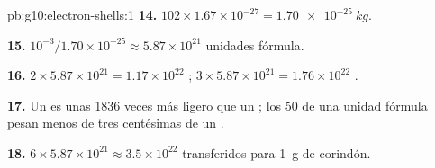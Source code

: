 \begin{solution}{pb:g10:electron-shells:1}
\textbf{14.} $102 \times 1.67 \times 10^{-27} = \qty{1.70e-25}{kg}$.

\textbf{15.} $10^{-3} / 1.70 \times 10^{-25} \approx 5.87 \times 10^{21}$
unidades fórmula.

\textbf{16.} $2 \times 5.87 \times 10^{21} = 1.17 \times 10^{22}$
 ; $3 \times 5.87 \times 10^{21} = 1.76 \times 10^{22}$
 .

\textbf{17.} Un  es unas 1836 veces más ligero que un ;
los 50  de una unidad fórmula pesan menos de tres centésimas
de un .

\textbf{18.} $6 \times 5.87 \times 10^{21} \approx 3.5 \times 10^{22}$
 transferidos para \qty{1}{g} de corindón.
\end{solution}
